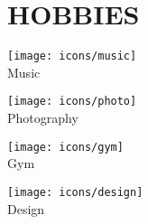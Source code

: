 {\color{primary}\section*{\MakeUppercase{Hobbies}}}

\begin{minipage}[t]{.15\textwidth}
	\centering
	\vbox{\texttt{[image: icons/music]}\\[4pt]Music}
\end{minipage}
\begin{minipage}[t]{.2\textwidth}
	\centering
	\vbox{\texttt{[image: icons/photo]}\\[4pt]Photography}
\end{minipage}
\begin{minipage}[t]{.15\textwidth}
	\centering
	\vbox{\texttt{[image: icons/gym]}\\[4pt]Gym}
\end{minipage}
\begin{minipage}[t]{.15\textwidth}
	\centering
	\vbox{\texttt{[image: icons/design]}\\[4pt]Design}
\end{minipage}
